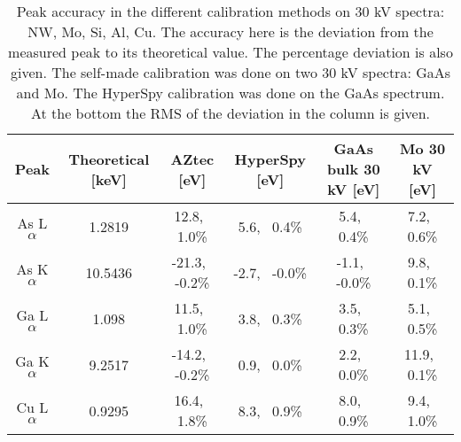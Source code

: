 
\begin{table}[p]
    \centering
    \caption{
        Peak accuracy in the different calibration methods on 30 kV spectra: NW, Mo, Si, Al, Cu. %
        The accuracy here is the deviation from the measured peak to its theoretical value.
        The percentage deviation is also given.
        The self-made calibration was done on two 30 kV spectra: GaAs and Mo. %
        The HyperSpy calibration was done on the GaAs spectrum.
        At the bottom the RMS of the deviation in the column is given.
    }
    \label{tab:results:calibration-peak-accuracy}
    \begin{tabular}{cccccc}
        Peak         & Theoretical [keV] & AZtec  [eV]           & HyperSpy [eV]         & GaAs bulk 30 kV [eV]  & Mo 30 kV [eV]         \\ %
        \hline
        As L$\alpha$ & 1.2819            & 12.8,\,\,\,    1.0\%  & 5.6,\,\,\,    0.4\%   & 5.4,\,\,\,    0.4\%   & 7.2,\,\,\,    0.6\%   \\
        As K$\alpha$ & 10.5436           & -21.3,\,\,\,   -0.2\% & -2.7,\,\,\,   -0.0\%  & -1.1,\,\,\,   -0.0\%  & 9.8,\,\,\,    0.1\%   \\
        Ga L$\alpha$ & 1.098             & 11.5,\,\,\,    1.0\%  & 3.8,\,\,\,    0.3\%   & 3.5,\,\,\,    0.3\%   & 5.1,\,\,\,    0.5\%   \\
        Ga K$\alpha$ & 9.2517            & -14.2,\,\,\,   -0.2\% & 0.9,\,\,\,    0.0\%   & 2.2,\,\,\,    0.0\%   & 11.9,\,\,\,    0.1\%  \\
        Cu L$\alpha$ & 0.9295            & 16.4,\,\,\,    1.8\%  & 8.3,\,\,\,    0.9\%   & 8.0,\,\,\,    0.9\%   & 9.4,\,\,\,    1.0\%   \\

\end{tabular}
\end{table}
